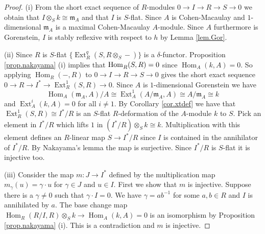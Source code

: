 \documentclass[a4paper,10pt]{amsart}
\theoremstyle{plain}
\theoremstyle{definition}
\theoremstyle{remark}
\numberwithin{equation}{xx}
\DeclareMathOperator{\Ext}{Ext}
\DeclareMathOperator{\Hom}{Hom}
\newcommand{\co}{\colon}
\newcommand{\ra}{\rightarrow}
\newcommand{\ot}{{\otimes}}
\newcommand{\fr}[1]{\mathfrak{{#1}}}
\newcommand{\hm}[4]{{\Hom}_{#2}^{#1}({#3},{#4})}
\newcommand{\xt}[4]{{\Ext} _{#2}^{#1}({#3},{#4})}
\begin{document}
\begin{proof}
(i) From the short exact sequence of \(R\)-modules \(0\ra I\ra R\ra S\ra 0\) we obtain that \(I\ot_{S}k\cong\fr{m}_{A}\) and that \(I\) is \(S\)-flat. Since \(A\) is Cohen-Macaulay and \(1\)-dimensional \(\fr{m}_{A}\) is a maximal Cohen-Macaulay \(A\)-module. Since \(A\) furthermore is Gorenstein, \(I\) is stably reflexive with respect to \(h\) by Lemma \ref{lem.Gor}.

(ii) Since \(R\) is \(S\)-flat \(\{\xt{q}{R}{S}{R\ot_{S}-}\}\) is a \(\delta\)-functor. Proposition \ref{prop.nakayama} (i) implies that \(\hm{}{R}{S}{R}\linebreak[1]=0\) since \(\hm{}{A}{k}{A}=0\). So applying \(\hm{}{R}{-}{R}\) to \(0\ra I\ra R\ra S\ra 0\) gives the short exact sequence \(0\ra R\ra I^{*}\ra \xt{1}{R}{S}{R}\ra 0\). Since \(A\) is \(1\)-dimensional Gorenstein we have 
\begin{equation}\label{eq.iso}
\hm{}{A}{\fr{m}_{A}}{A}/A\cong\xt{1}{A}{A/\fr{m}_{A}}{A}\cong A/\fr{m}_{A}\cong k
\end{equation}
and \(\xt{i}{A}{k}{A}=0\) for all \(i\neq 1\). By Corollary \ref{cor.xtdef} we have that \(\xt{1}{R}{S}{R}\cong I^{*}/R\) is an \(S\)-flat \(R\)-deformation of the \(A\)-module \(k\) to \(S\). Pick an element in \(I^{*}/R\) which lifts \(1\) in \((I^{*}/R)\ot_{S}k\cong k\). Multiplication with this element defines an \(R\)-linear map \(S\ra I^{*}/R\) since \(I\) is contained in the annihilator of \(I^{*}/R\). By Nakayama's lemma the map is surjective. Since \(I^{*}/R\) is \(S\)-flat it is injective too. 

(iii) Consider the map \(m\co J\ra I^{*}\) defined by the multiplication map \(m_{\gamma}(u)=\gamma{\cdot} u\) for \(\gamma\in J\) and \(u\in I\). First we show that \(m\) is injective. Suppose there is a \(\gamma\neq 0\) such that \(\gamma{\cdot} I=0\). We have \(\gamma=ab^{-1}\) for some \(a, b\in R\) and \(I\) is annihilated by \(a\). The base change map \(\hm{}{R}{R/I}{R}\ot_{S}k\ra\hm{}{A}{k}{A}=0\) is an isomorphism by Proposition \ref{prop.nakayama} (i). This is a contradiction and \(m\) is injective.


\end{proof}
\end{document}

